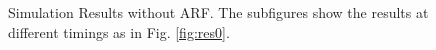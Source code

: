 \documentclass[a4paper,12pt, oneside]{book}
\begin{document}
\begin{figure}[tbp]
 \caption{Simulation Results without ARF. The subfigures show the results at different timings as in Fig. \ref{fig:res0}.}
 \label{fig:res3}
\end{figure}
\end{document}
